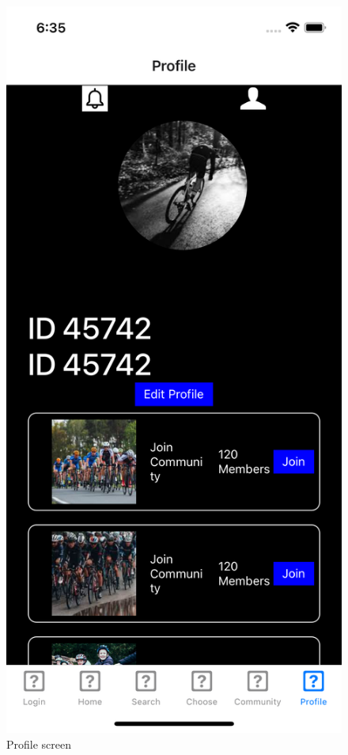 \documentclass{l4proj}
\begin{document}
\begin{figure}
    \centering
        \includegraphics[scale=0.19]{images/999.png}
     \caption{Profile screen }
    \label{fig:my_label}
\end{figure}
\end{document}
